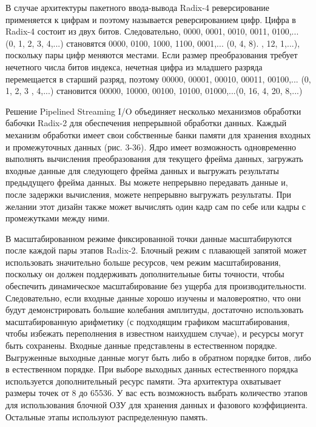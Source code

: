 В случае архитектуры пакетного ввода-вывода Radix-4 реверсирование применяется к цифрам и поэтому называется реверсированием цифр. Цифра в Radix-4 состоит из двух битов. Следовательно, 0000, 0001, 0010, 0011, 0100,... (0, 1, 2, 3, 4,...) становятся 0000, 0100, 1000, 1100, 0001,... (0, 4, 8). , 12, 1,...), поскольку пары цифр меняются местами. Если размер преобразования требует нечетного числа битов индекса, нечетная цифра из младшего разряда перемещается в старший разряд, поэтому 00000, 00001, 00010, 00011, 00100,... (0, 1, 2, 3 , 4,...) становится 00000, 10000, 00100, 10100, 01000,...(0, 16, 4, 20, 8,...)

Решение Pipelined Streaming I/O объединяет несколько механизмов обработки бабочки Radix-2 для обеспечения непрерывной обработки данных. Каждый механизм обработки имеет свои собственные банки памяти для хранения входных и промежуточных данных (рис. 3-36). Ядро имеет возможность одновременно выполнять вычисления преобразования для текущего фрейма данных, загружать входные данные для следующего фрейма данных и выгружать результаты предыдущего фрейма данных. Вы можете непрерывно передавать данные и, после задержки вычисления, можете непрерывно выгружать результаты. При желании этот дизайн также может вычислять один кадр сам по себе или кадры с промежутками между ними.

В масштабированном режиме фиксированной точки данные масштабируются после каждой пары этапов Radix-2. Блочный режим с плавающей запятой может использовать значительно больше ресурсов, чем режим масштабирования, поскольку он должен поддерживать дополнительные биты точности, чтобы обеспечить динамическое масштабирование без ущерба для производительности. Следовательно, если входные данные хорошо изучены и маловероятно, что они будут демонстрировать большие колебания амплитуды, достаточно использовать масштабированную арифметику (с подходящим графиком масштабирования, чтобы избежать переполнения в известном наихудшем случае), и ресурсы могут быть сохранены. Входные данные представлены в естественном порядке. Выгруженные выходные данные могут быть либо в обратном порядке битов, либо в естественном порядке. При выборе выходных данных естественного порядка используется дополнительный ресурс памяти. Эта архитектура охватывает размеры точек от 8 до 65536. У вас есть возможность выбрать количество этапов для использования блочной ОЗУ для хранения данных и фазового коэффициента. Остальные этапы используют распределенную память.

